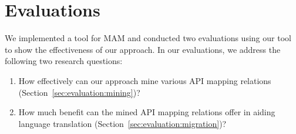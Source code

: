 \section{Evaluations}
\label{sec:evaluation}

We implemented a tool for MAM and
conducted two evaluations using our tool to show the effectiveness
of our approach. In our evaluations, we address the following
two research questions:

\vspace*{-1.5ex}
\begin{enumerate}
\item How effectively can our approach mine various API mapping relations
(Section~\ref{sec:evaluation:mining})? \vspace*{-1.8ex}
\item How much benefit can the mined API mapping relations offer in aiding language
translation (Section~\ref{sec:evaluation:migration})?\vspace*{-1.6ex}

\end{enumerate}%


